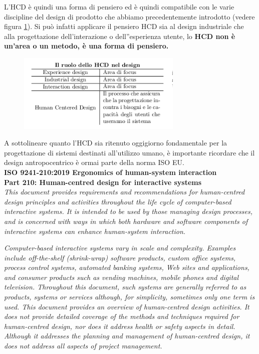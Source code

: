 L'HCD è quindi una forma di pensiero ed è quindi compatibile con le varie discipline del design di prodotto che abbiamo precedentemente introdotto (vedere figura \ref{hcd}). 
Si può infatti applicare il pensiero HCD sia al design industriale che alla progettazione dell'interazione o dell''esperienza utente, lo \textbf{HCD non è un'area o un metodo, è una forma di pensiero.}

\begin{figure}[!h]
	\centering
	\includegraphics[width=0.7\textwidth]{immagini/HCD}
	
	\label{hcd}
\end{figure}

A sottolineare quanto l'HCD sia ritenuto oggigiorno fondamentale per la progettazione di sistemi destinati all'utilizzo umano, è importante ricordare che il design antropocentrico è ormai parte della norma ISO EU. \\

\textbf{ISO 9241-210:2019 Ergonomics of human-system interaction\\ Part 210: Human-centred design for interactive systems}\\

\textit{This document provides requirements and recommendations for human-centred design principles and activities throughout the life cycle of computer-based interactive systems. It is intended to be used by those managing design processes, and is concerned with ways in which both hardware and software components of interactive systems can enhance human-system interaction.}

\textit{Computer-based interactive systems vary in scale and complexity. Examples include off-the-shelf (shrink-wrap) software products, custom office systems, process control systems, automated banking systems, Web sites and applications, and consumer products such as vending machines, mobile phones and digital television. Throughout this document, such systems are generally referred to as products, systems or services although, for simplicity, sometimes only one term is used. This document provides an overview of human-centred design activities. It does not provide detailed coverage of the methods and techniques required for human-centred design, nor does it address health or safety aspects in detail. Although it addresses the planning and management of human-centred design, it does not address all aspects of project management. }


